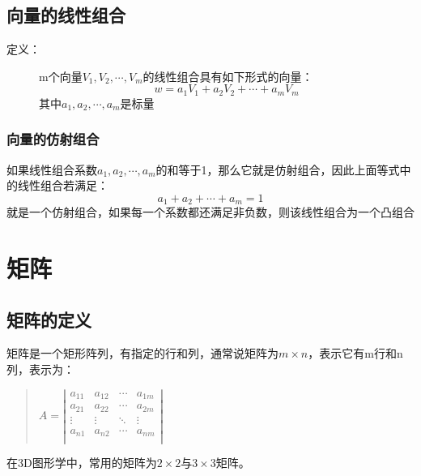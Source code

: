 \documentclass[a4paper,10pt]{article}
\begin{document}
\begin{CJK}{UTF8}{song}
\subsection{向量的线性组合}
\begin{description}
\item[定义：]m个向量$V_1,V_2,\cdots{},V_m$的线性组合具有如下形式的向量：
\begin{displaymath}
w=a_1V_1+a_2V_2+\cdots{}+a_mV_m
\end{displaymath}
其中$a_1,a_2,\cdots{},a_m$是标量
\end{description}
\subsubsection{向量的仿射组合}
如果线性组合系数$a_1,a_2,\cdots{},a_m$的和等于1，那么它就是仿射组合，因此上面等式中的线性组合若满足：
\begin{displaymath}
a_1+a_2+\cdots{}+a_m=1
\end{displaymath}
就是一个仿射组合，如果每一个系数都还满足非负数，则该线性组合为一个凸组合





\section{矩阵}
\subsection{矩阵的定义}
矩阵是一个矩形阵列，有指定的行和列，通常说矩阵为$m\times n$，表示它有m行和n列，表示为：
\begin{quote}
\begin{math}
A=\left|
\begin{array}{cccc}
a_{11} & a_{12} & \cdots & a_{1m} \\
a_{21} & a_{22} & \cdots & a_{2m} \\
\vdots & \vdots & \ddots & \vdots \\
a_{n1} & a_{n2} & \cdots & a_{nm} \\
\end{array}
   \right|
\end{math}
\end{quote}
在3D图形学中，常用的矩阵为$2\times 2$与$3\times 3$矩阵。

\end{CJK}
\end{document}
